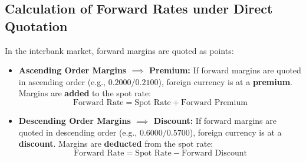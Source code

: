 \subsection{Calculation of Forward Rates under Direct Quotation}
In the interbank market, forward margins are quoted as points:
\begin{itemize}[leftmargin=*]
    \item \textbf{Ascending Order Margins $\implies$ Premium:} If forward margins are quoted in ascending order (e.g., $0.2000 / 0.2100$), foreign currency is at a \textbf{premium}. Margins are \textbf{added} to the spot rate:
    \begin{equation}
        \text{Forward Rate} = \text{Spot Rate} + \text{Forward Premium}
    \end{equation}
    \item \textbf{Descending Order Margins $\implies$ Discount:} If forward margins are quoted in descending order (e.g., $0.6000 / 0.5700$), foreign currency is at a \textbf{discount}. Margins are \textbf{deducted} from the spot rate:
    \begin{equation}
        \text{Forward Rate} = \text{Spot Rate} - \text{Forward Discount}
    \end{equation}
\end{itemize}

